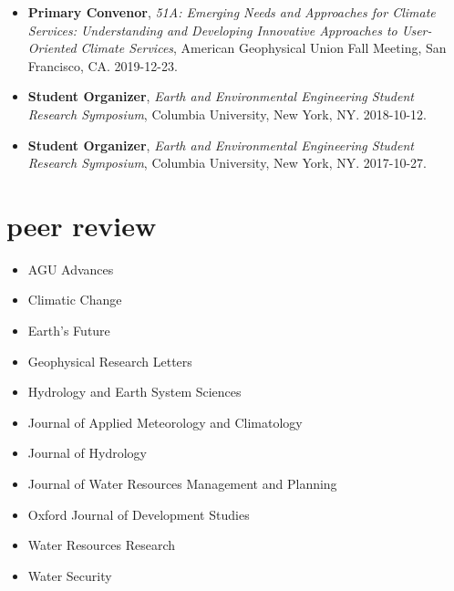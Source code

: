 \documentclass[10pt,oneside]{article}
\begin{document}
\begin{itemize}[label={}]

  \item \textbf{Primary Convenor}, \textit{51A: Emerging Needs and Approaches for Climate Services: Understanding and Developing Innovative Approaches to User-Oriented Climate Services}, American Geophysical Union Fall Meeting, San Francisco, CA. 2019-12-23.

  \item \textbf{Student Organizer}, \textit{Earth and Environmental Engineering Student Research Symposium}, Columbia University, New York, NY. 2018-10-12.

  \item \textbf{Student Organizer}, \textit{Earth and Environmental Engineering Student Research Symposium}, Columbia University, New York, NY. 2017-10-27.

\end{itemize}


\section{peer review}

\mbox{}\vspace{-\dimexpr\baselineskip\relax}

\begin{itemize}[label={}]

  \item AGU Advances

  \item Climatic Change

  \item Earth's Future

  \item Geophysical Research Letters

  \item Hydrology and Earth System Sciences

  \item Journal of Applied Meteorology and Climatology

  \item Journal of Hydrology

  \item Journal of Water Resources Management and Planning

  \item Oxford Journal of Development Studies

  \item Water Resources Research

  \item Water Security

\end{itemize}
\end{document}
